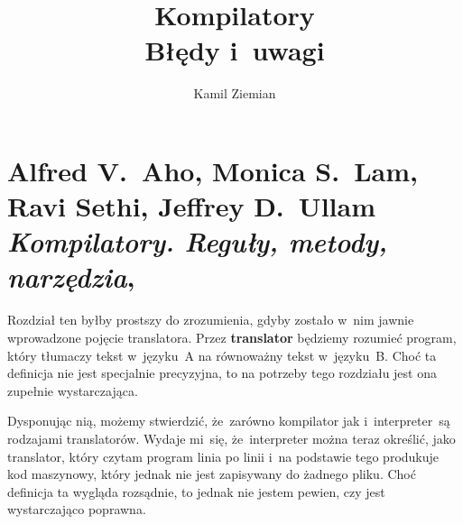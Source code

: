 \documentclass[a4paper,11pt]{article}
\title{Kompilatory \\
  {\Large Błędy i~uwagi}}
\author{Kamil Ziemian}
\numberwithin{equation}{section}
\begin{document}





\maketitle










\section{Alfred V.~Aho, Monica S.~Lam, Ravi Sethi,
  Jeffrey D.~Ullam \textit{Kompilatory. Reguły, metody,
    narzędzia},
  \parencite{Aho-Lam-Sethi-Ullman-Kompilatory-Pub-2019}}

\vspace{0em}



\vspace{0em}


\noindent
Rozdział ten byłby prostszy do zrozumienia, gdyby zostało w~nim jawnie
wprowadzone pojęcie translatora. Przez \textbf{translator} będziemy rozumieć
program, który tłumaczy tekst w~języku~A na równoważny tekst w~języku~B.
Choć ta definicja nie jest specjalnie precyzyjna, to na potrzeby tego
rozdziału jest ona zupełnie wystarczająca.

Dysponując nią, możemy stwierdzić, że~zarówno kompilator jak
i~interpreter~są rodzajami translatorów. Wydaje mi~się, że~interpreter można
teraz określić, jako translator, który czytam program linia po linii i~na
podstawie tego produkuje kod maszynowy, który jednak nie jest zapisywany
do żadnego pliku. Choć definicja ta wygląda rozsądnie, to jednak nie jestem
pewien, czy jest wystarczająco poprawna.
\end{document}
